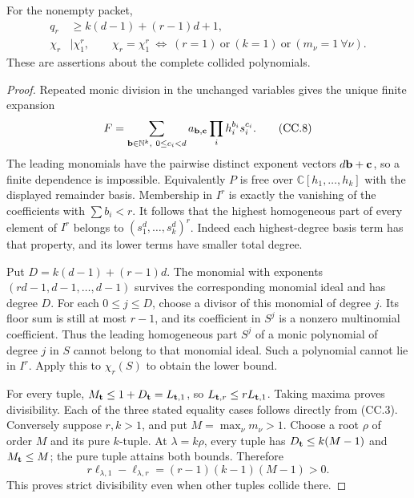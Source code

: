 \begin{proposition}
For the nonempty packet,
\[
\begin{aligned}
 q_r&\geq k(d-1)+(r-1)d+1,\\
 \chi_r&\mid\chi_1^r,\qquad
 \chi_r=\chi_1^r
 \ \Longleftrightarrow\
 (r=1)\ \text{or}\ (k=1)\ \text{or}\ (m_\nu=1\ \forall\nu).
\end{aligned}
\tag{CC.7}
\]
These are assertions about the complete collided polynomials.
\end{proposition}
\begin{proof}
Repeated monic division in the unchanged variables gives the unique
finite expansion
\[
 F=\sum_{{\bf b}\in\mathbb N^k,\ 0\leq c_i<d}
 a_{{\bf b},{\bf c}}\prod_i h_i^{b_i}s_i^{c_i}.
 \tag{CC.8}
\]
The leading monomials have the pairwise distinct exponent vectors
\(d{\bf b}+{\bf c}\), so a finite dependence is impossible.
Equivalently \(P\) is free over \(\mathbb C[h_1,\ldots,h_k]\)
with the displayed remainder basis.  Membership in \(I^r\)
is exactly the vanishing of the coefficients with \(\sum b_i<r\).
It follows that the highest homogeneous part of every element of
\(I^r\) belongs to \((s_1^d,\ldots,s_k^d)^r\).
Indeed each highest-degree basis term has that property, and its
lower terms have smaller total degree.

Put \(D=k(d-1)+(r-1)d\).
The monomial with exponents \((rd-1,d-1,\ldots,d-1)\) survives the
corresponding monomial ideal and has degree \(D\).
For each \(0\leq j\leq D\), choose a divisor of this monomial of
degree \(j\).  Its floor sum is still at most \(r-1\), and its
coefficient in \(S^j\) is a nonzero multinomial coefficient.
Thus the leading homogeneous part \(S^j\) of a monic polynomial
of degree \(j\) in \(S\) cannot belong to that monomial ideal.
Such a polynomial cannot lie in \(I^r\).  Apply this to \(\chi_r(S)\)
to obtain the lower bound.

For every tuple, \(M_{\bf t}\leq1+D_{\bf t}=L_{{\bf t},1}\), so
\(L_{{\bf t},r}\leq rL_{{\bf t},1}\).
Taking maxima proves divisibility.  Each of the three stated
equality cases follows directly from (CC.3).
Conversely suppose \(r,k>1\), and put \(M=\max_\nu m_\nu>1\).
Choose a root \(\rho\) of order \(M\) and its pure \(k\)-tuple.
At \(\lambda=k\rho\), every tuple has
\(D_{\bf t}\leq k(M-1)\) and \(M_{\bf t}\leq M\);
the pure tuple attains both bounds.  Therefore
\[
 r\ell_{\lambda,1}-\ell_{\lambda,r}
 =(r-1)(k-1)(M-1)>0.
 \tag{CC.9}
\]
This proves strict divisibility even when other tuples collide there.
\end{proof}

